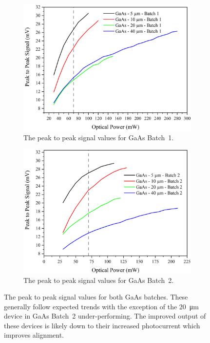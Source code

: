 \begin{figure}[ht!]%
\centering
\begin{subfigure}{1\textwidth}
    \centering
    \includegraphics[scale=0.4]{Figures/Misc/SysDev/OptGaAsBatch1G.png}
    \caption{The peak to peak signal values for GaAs Batch~1.}
    \label{fig:gaasbatch1}
\end{subfigure}
\begin{subfigure}{1\textwidth}
    \centering
    \includegraphics[scale=0.4]{Figures/Misc/SysDev/OptGaAsBatch2G.png}
    \caption{The peak to peak signal values for GaAs Batch~2.}
    \label{fig:gaasbatch2}
\end{subfigure}
\captionsetup{font = footnotesize, justification = centering}
\caption[The Peak to Peak Signal Values for both GaAs Batches - Seperate]{The peak to peak signal values for both GaAs batches. These generally follow expected trends with the exception of the \SI{20}{\micro\metre} device in GaAs Batch~2 under\nobreakdash-performing. The improved output of these devices is likely down to their increased photocurrent which improves alignment.}
\label{fig:gaasboth1}
\end{figure}

